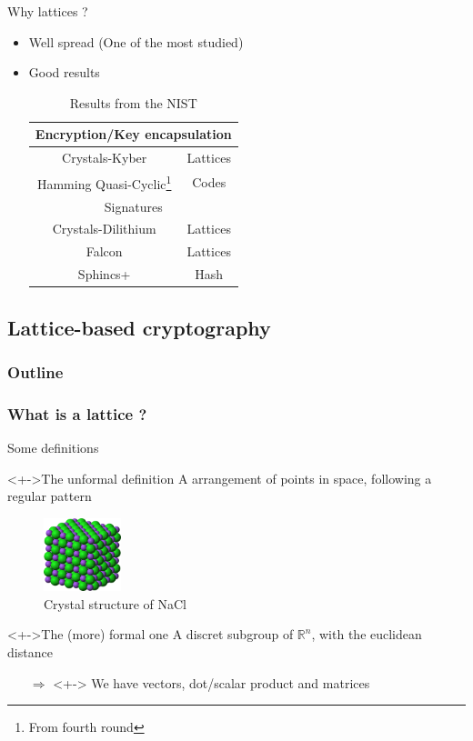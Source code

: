 \documentclass{beamer}
\begin{document}
\begin{frame}{Why lattices ?}
	\begin{itemize}
		\item Well spread (One of the most studied)
		\item Good results
			\begin{table}[h!]
			\begin{tabular}{|c|c|}
				\hline
				\multicolumn{2}{|c|}{Encryption/Key encapsulation} \\
				\hline
				Crystals-Kyber & Lattices \\
				Hamming Quasi-Cyclic\footnote{From fourth round} & Codes \\
				\hline
				\multicolumn{2}{|c|}{Signatures} \\
				\hline
				Crystals-Dilithium & Lattices \\
				Falcon & Lattices \\
				Sphincs+ & Hash \\
				\hline
			\end{tabular}
			\center
			\caption{Results from the NIST}
			\end{table}
	\end{itemize}
\end{frame}

\subsection{Lattice-based cryptography}
\begin{frame}
  \frametitle{Outline}
\end{frame}

\subsubsection{What is a lattice ?}
\begin{frame}{Some definitions}
	\begin{block}<+->{The unformal definition}
		A arrangement of points in space, following a regular pattern
	\end{block}
	\begin{figure}[H]
		\includegraphics[width=0.2\textwidth]{Sodium-chloride-3D-ionic.png}
		\center
		\caption{Crystal structure of NaCl}
	\end{figure}

	\begin{block}<+->{The (more) formal one}
		A discret subgroup of $\mathbb{R}^n$, with the euclidean distance
	\end{block}
	\begin{itemize}
		\item[$\Rightarrow$]<+-> We have vectors, dot/scalar product and matrices
	\end{itemize}
\end{frame}
\end{document}
